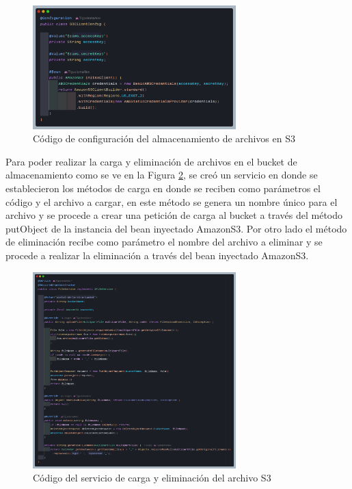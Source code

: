 \begin{figure}[H]
    \centering
    \includegraphics[width=0.7\textwidth]{resources/images/s3}
    \caption{Código de configuración del almacenamiento de archivos en S3}
    \label{fig:s3-config}
\end{figure}

Para poder realizar la carga y eliminación de archivos en el bucket de almacenamiento como se ve en la Figura \ref{fig:s3-fileService}, se creó un servicio en donde se establecieron los métodos de carga en donde se reciben como parámetros el código y el archivo a cargar, en este método se genera un nombre único para el archivo y se procede a crear una petición de carga al bucket a través del método putObject de la instancia del bean inyectado AmazonS3.
Por otro lado el método de eliminación recibe como parámetro el nombre del archivo a eliminar y se procede a realizar la eliminación a través del bean inyectado AmazonS3.

\begin{figure}[H]
    \centering
    \includegraphics[width=0.7\textwidth]{resources/images/fileService}
    \caption{Código del servicio de carga y eliminación del archivo S3}
    \label{fig:s3-fileService}
\end{figure}


